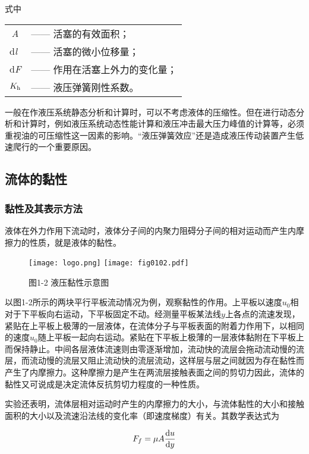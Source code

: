 \noindent 式中\quad %
\begin{tabular}[t]{p{1mm}l}
    $\ $\textit{A} &—— 活塞的有效面积；\\
    d\textit{l} &—— 活塞的微小位移量；\\
    d\textit{F} &—— 作用在活塞上外力的变化量；\\
    $K_{\rm h}$ &—— 液压弹簧刚性系数。
\end{tabular}

一般在作液压系统静态分析和计算时，可以不考虑液体的压缩性。但在进行动态分析和计算时，例如液压系统动态性能计算和液压冲击最大压力峰值的计算等，必须重视油的可压缩性这一因素的影响。“液压弹簧效应”还是造成液压传动装置产生低速爬行的一个重要原因。

\subsection{流体的黏性}
\subsubsection{黏性及其表示方法}
液体在外力作用下流动时，液体分子间的内聚力阻碍分子间的相对运动而产生内摩擦力的性质，就是液体的黏性。

\begin{figure}[htb]%
    \centering
    \ifOpenSource
    \texttt{[image: logo.png]}
    \else
    \texttt{[image: fig0102.pdf]}%
    \fi
    \caption{图1-2 液压黏性示意图}
    \label{fig:fig0102}%
\end{figure}

以图1-2所示的两块平行平板流动情况为例，观察黏性的作用。上平板以速度$u_0$相对于下平板向右运动，下平板固定不动。经测量平板某法线$y$上各点的流速发现，紧贴在上平板上极薄的一层液体，在流体分子与平板表面的附着力作用下，以相同的速度$u_0$随上平板一起向右运动。紧贴在下平板上极薄的一层液体黏附在下平板上而保持静止。中间各层液体流速则由零逐渐增加，流动快的流层会拖动流动慢的流层，而流动慢的流层又阻止流动快的流层流动，这样层与层之间就因为存在黏性而产生了内摩擦力。这种摩擦力是产生在两流层接触表面之间的剪切力因此，流体的黏性又可说成是决定流体反抗剪切力程度的一种性质。

实验还表明，流体层相对运动时产生的内摩擦力的大小，与流体黏性的大小和接触面积的大小以及流速沿法线的变化率（即速度梯度）有关。其数学表达式为

\begin{equation}
    F_f=\mu A\frac{{\rm d}u}{{\rm d}y}
\end{equation}

